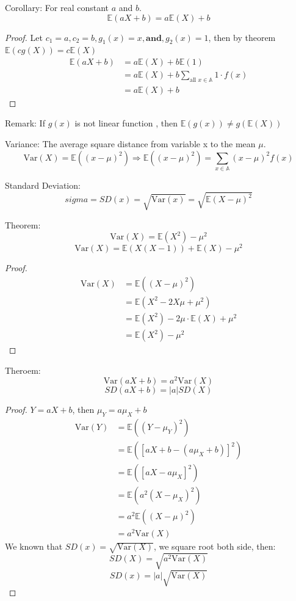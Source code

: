 \documentclass{article}
\newcommand{\E}{\mathbb{E}}
\newcommand{\Var}{\mathrm{Var}}
\begin{document}
\noindent Corollary: For real constant $a$ and $b$.
$$\E(aX+b) = a\E(X) + b$$
\begin{proof}
Let $c_{1} = a, c_{2} = b, g_{1}(x) = x, \textbf{and}, g_{2}(x) = 1$, then by theorem $ \E(cg(X)) = c\E(X)$
\begin{align*}
    \E(aX + b) &= a\E(X) + b\E(1)\\
               &= a\E(X) + b \sum_{\text{all } x \in \mathbb{A}}1 \cdot f(x)\\
               &= a\E(X) + b
\end{align*}
\end{proof}

\noindent Remark: If $g(x)$ is not linear function , then $\E(g(x)) \ne g(\E(X))$

\noindent Variance: The average square distance from variable x to the mean $\mu$.
$$\Var(X) = \E((x - \mu)^2) \Rightarrow \E((x - \mu)^2) = \sum_{x \in \mathbb{A}}(x - \mu)^2f(x)$$ 

\noindent Standard Deviation: $$sigma = SD(x) = \sqrt{\Var(x)} = \sqrt{\E(X - \mu) ^ 2}$$

\noindent Theorem:    
$$\Var(X) = \E(X^2) - \mu ^ 2$$
$$\Var(X) = \E(X(X - 1)) + \E(X) - \mu ^2$$

\begin{proof}
\begin{align*}
\Var(X) &= \E((X - \mu) ^2) \\
        &= \E(X^2 - 2X\mu + \mu^2) \\
        &= \E(X^2) - 2\mu \cdot \E(X) + \mu^2 \\
        &= \E(X^2) - \mu^2
\end{align*}
\end{proof}

\noindent Theroem: 
$$\Var(aX + b) = a^2 \Var(X)$$
$$SD(aX + b) = |a| SD(X)$$
\begin{proof}
$Y = aX + b$, then $\mu_{Y} = a\mu_{X} + b$ \\
\begin{align*}
\Var(Y) &= \E((Y - \mu_{Y})^2) \\ 
        &= \E([aX + b - (a\mu_{X} + b)] ^ 2) \\
        &= \E([aX - a\mu_{X}]^2) \\
        &= \E(a^2(X - \mu_{X})^2) \\
        &= a^2\E((X - \mu)^2) \\
        &= a^2 \Var(X)
\end{align*}
We known that $SD(x) = \sqrt{\Var(X)}$, we square root both side, then:
$$SD(X) = \sqrt{a^2\Var(X)}$$
$$SD(x) = |a|\sqrt{\Var(X)}$$
\end{proof}
\end{document}
